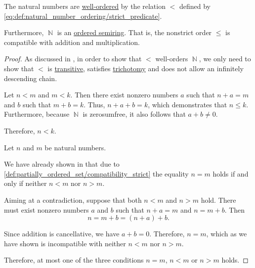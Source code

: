 \begin{proposition}\label{thm:natural_numbers_are_well_ordered}
  The natural numbers are \hyperref[def:well_ordered_set]{well-ordered} by the relation \( < \) defined by \eqref{eq:def:natural_number_ordering/strict_predicate}.

  Furthermore, \( \BbbN \) is an \hyperref[def:ordered_semiring]{ordered semiring}. That is, the nonstrict order \( \leq \) is compatible with addition and multiplication.
\end{proposition}
\begin{proof}
  As discussed in , in order to show that \( < \) well-orders \( \BbbN \), we only need to show that \( < \) is \hyperref[def:binary_relation/transitive]{transitive}, satisfies \hyperref[def:binary_relation/trichotomic]{trichotomy} and does not allow an infinitely descending chain.

   Let \( n < m \) and \( m < k \). Then there exist nonzero numbers \( a \) such that \( n + a = m \) and \( b \) such that \( m + b = k \). Thus, \( n + a + b = k \), which demonstrates that \( n \leq k \). Furthermore, because \( \BbbN \) is zerosumfree, it also follows that \( a + b \neq 0 \).

  Therefore, \( n < k \).

   Let \( n \) and \( m \) be natural numbers.

  We have already shown in  that due to \eqref{def:partially_ordered_set/compatibility_strict} the equality \( n = m \) holds if and only if neither \( n < m \) nor \( n > m \).

  Aiming at a contradiction, suppose that both \( n < m \) and \( n > m \) hold. There must exist nonzero numbers \( a \) and \( b \) such that \( n + a = m \) and \( n = m + b \). Then
  \begin{equation*}
    n = m + b = (n + a) + b.
  \end{equation*}

  Since addition is cancellative, we have \( a + b = 0 \). Therefore, \( n = m \), which as we have shown is incompatible with neither \( n < m \) nor \( n > m \).

  Therefore, at most one of the three conditions \( n = m \), \( n < m \) or \( n > m \) holds.


\end{proof}
